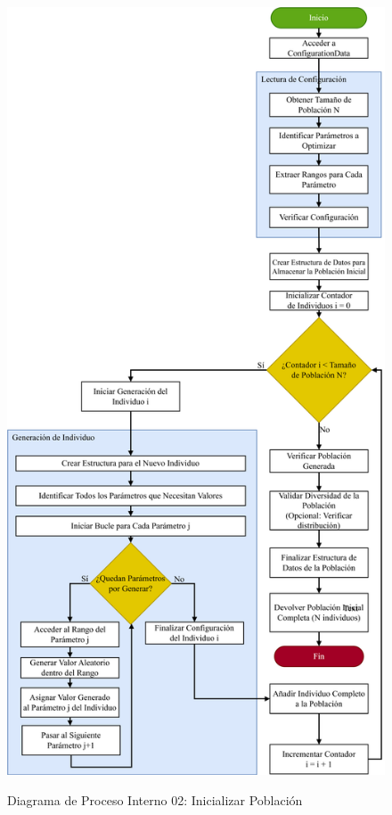 \begin{figure}[H]
{        \includegraphics{img/Analisis/DiagramaProcesos/DiagramaProceso02_InicializarPoblacion.png}
    }
        \caption{Diagrama de Proceso Interno 02: Inicializar Población}%
    \label{fig:process_diagram02}
\end{figure}
\newpage